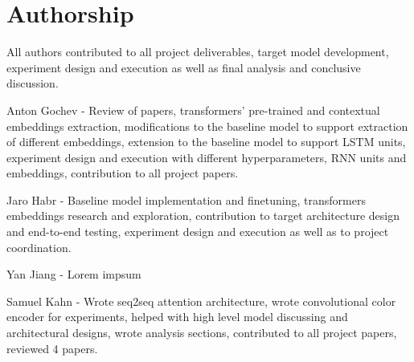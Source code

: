 \section*{Authorship}

All authors contributed to all project deliverables, target model development, experiment design and execution as well as final analysis and conclusive discussion.

Anton Gochev - Review of papers, transformers’ pre-trained and contextual embeddings extraction, modifications to the baseline model to support extraction of different embeddings, extension to the baseline model to support LSTM units, experiment design and execution with different hyperparameters, RNN units and embeddings, contribution to all project papers.

Jaro Habr - Baseline model implementation and finetuning, transformers embeddings research and exploration, contribution to target architecture design and end-to-end testing, experiment design and execution as well as to project coordination.

Yan Jiang - Lorem impsum

Samuel Kahn - Wrote seq2seq attention architecture, wrote convolutional color encoder for experiments, helped with high level model discussing and architectural designs, wrote analysis sections, contributed to all project papers, reviewed 4 papers.
